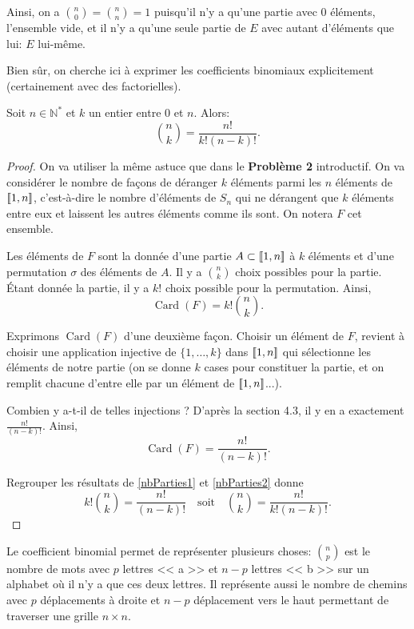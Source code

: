 \documentclass[11pt]{article}
\newcommand{\N}{\mathbb N}
\DeclareMathOperator{\Card}{\mathrm{Card}}
\DeclarePairedDelimiter{\zint}{[\![}{]\!]}
\theoremstyle{definition}
\theoremstyle{remark}
\theoremstyle{theorem}
\begin{document}
Ainsi, on a $\binom{n}{0} = \binom{n}{n} = 1$ puisqu'il n'y a qu'une partie avec 0 éléments, l'ensemble vide, et il n'y a qu'une seule partie de $E$ avec autant d'éléments que lui: $E$ lui-même.

Bien sûr, on cherche ici à exprimer les coefficients binomiaux explicitement (certainement avec des factorielles).

\begin{prop}
	Soit $n\in\N^*$ et $k$ un entier entre 0 et $n$. Alors:
	\[
	\binom{n}{k} = \frac{n!}{k!(n-k)!}.
	\]
\end{prop}

\begin{proof}
On va utiliser la même astuce que dans le \textbf{Problème 2} introductif. On va considérer le nombre de façons de déranger $k$ éléments parmi les $n$ éléments de $\zint{1,n}$, c'est-à-dire le nombre d'éléments de $S_n$ qui ne dérangent que $k$ éléments entre eux et laissent les autres éléments comme ils sont. On notera $F$ cet ensemble.

Les éléments de $F$ sont la donnée d'une partie $A\subset \zint{1,n}$ à $k$ éléments et d'une permutation $\sigma$ des éléments de $A$. Il y a $\binom{n}{k}$ choix possibles pour la partie. Étant donnée la partie, il y a $k!$ choix possible pour la permutation. Ainsi,
\begin{equation}\label{nbParties1}
\Card(F) = k!\binom{n}{k}.
\end{equation}

Exprimons $\Card(F)$ d'une deuxième façon. Choisir un élément de $F$, revient à choisir une application injective de $\{1,\ldots,k\}$ dans $\zint{1,n}$ qui sélectionne les éléments de notre partie (on se donne $k$ cases pour constituer la partie, et on remplit chacune d'entre elle par un élément de $\zint{1,n}$...). 

Combien y a-t-il de telles injections ? D'après la section 4.3, il y en a exactement $\frac{n!}{(n-k)!}$. Ainsi,
\begin{equation}\label{nbParties2}
\Card(F) = \frac{n!}{(n-k)!}.
\end{equation}

Regrouper les résultats de \eqref{nbParties1} et \eqref{nbParties2} donne
\[
k!\binom{n}{k} = \frac{n!}{(n-k)!}\quad \text{soit}\quad \boxed{\binom{n}{k} = \frac{n!}{k!(n-k)!}.}
\]
\end{proof}

Le coefficient binomial permet de représenter plusieurs choses: $\displaystyle \binom{n}{p}$ est le nombre de mots avec $p$ lettres << a >> et $n-p$ lettres << b >> sur un alphabet où il n'y a que ces deux lettres. Il représente aussi le nombre de chemins avec $p$ déplacements à droite et $n-p$ déplacement vers le haut permettant de traverser une grille $n\times n$.
\end{document}
